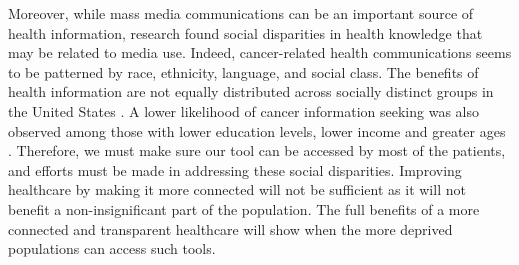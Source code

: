 Moreover, while mass media communications can be an important source of health information, research found social disparities in health knowledge that may be related to media use. Indeed, cancer-related health communications seems to be patterned by race, ethnicity, language, and social class. The benefits of health information are not equally distributed across socially distinct groups in the United States \cite{viswanath_race_2011}. A lower likelihood of cancer information seeking was also observed among those with lower education levels, lower income and greater ages \cite{finney_rutten_cancer-related_2016}. Therefore, we must make sure our tool can be accessed by most of the patients, and efforts must be made in addressing these social disparities. Improving healthcare by making it more connected will not be sufficient as it will not benefit a non-insignificant part of the population. The full benefits of a more connected and transparent healthcare will show when the more deprived populations can access such tools.
